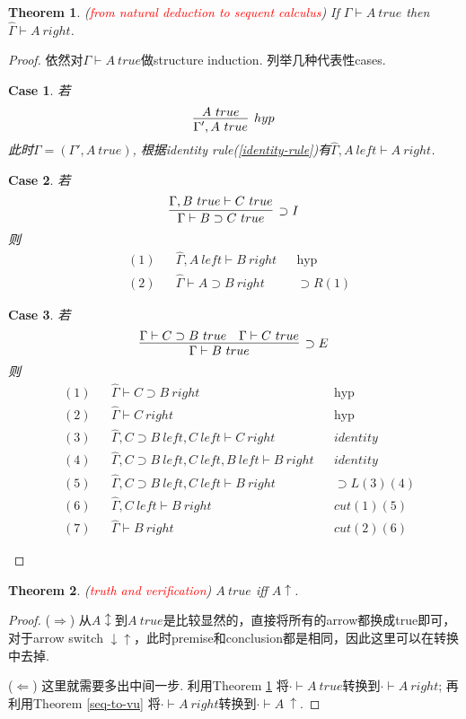 \documentclass{article}
\theoremstyle{plain}
\newtheorem{theorem}{Theorem}
\newcounter{case}
\newtheorem{case}{Case}
\theoremstyle{nonumberplain}
\newtheorem{proof}{Proof}
\newcommand{\redt}[1]{\textcolor{red}{#1}}
\begin{document}
\begin{theorem}\label{nd-to-seq}
\rm (\redt{from natural deduction to sequent calculus}) If $\Gamma \vdash A~true$ then $\widehat{\Gamma} \vdash A~right$.
\end{theorem}

\begin{proof}
\rm 依然对$\Gamma \vdash A~true$做structure induction. 列举几种代表性cases.
\begin{case}若
$$
\infer[hyp]{\Gamma', A~true}{A~true}
$$
此时$\Gamma = (\Gamma', A~true)$, 根据\emph{identity} rule(\ref{identity-rule})有$\widehat{\Gamma}, A~left \vdash A~right$.
\end{case}
\begin{case}若
$$
\infer[\supset I]{\Gamma \vdash B \supset C~true}{\Gamma, B~true \vdash C~true}
$$
则
$$
\begin{aligned}
&(1) && \widehat{\Gamma} ,A~left \vdash B~right  && \text{hyp} \\
&(2) && \widehat{\Gamma}  \vdash A \supset B ~right && \supset R(1)
\end{aligned}
$$
\end{case}
\begin{case}若
$$
\infer[\supset E]{\Gamma \vdash B~true}{\Gamma \vdash C \supset B~true & \Gamma \vdash C ~true}
$$
则
$$
\begin{aligned}
&(1) &&\widehat{\Gamma} \vdash C\supset B~right && \text{hyp} \\
&(2) &&\widehat{\Gamma} \vdash C~right && \text{hyp} \\
&(3) &&\widehat{\Gamma},C \supset B~left, C~left \vdash C~right && identity \\
&(4) &&\widehat{\Gamma},C \supset B~left, C~left, B~left \vdash B~right && identity \\ 
&(5) &&\widehat{\Gamma},C \supset B~left, C~left \vdash B~right && \supset L(3)(4) \\
&(6) &&\widehat{\Gamma}, C~left \vdash B~right && cut (1)(5) \\
&(7) &&\widehat{\Gamma} \vdash B~right && cut(2)(6)
\end{aligned}
$$
\end{case}
\end{proof}

\begin{theorem}
\rm (\redt{truth and verification}) $A~true$ iff $A \uparrow$. 
\end{theorem}

\begin{proof}
\rm ($\Rightarrow$) 从$A \updownarrow$到$A~true$是比较显然的，直接将所有的arrow都换成true即可，对于arrow switch $\downarrow\uparrow$，此时premise和conclusion都是相同，因此这里可以在转换中去掉. 

($\Leftarrow$) 这里就需要多出中间一步. 利用Theorem \ref{nd-to-seq} 将$\cdot\vdash A~true$转换到$\cdot \vdash A~right$; 再利用Theorem \ref{seq-to-vu} 将$\cdot \vdash A~right$转换到$\cdot \vdash A~\uparrow$. 
\end{proof}
\end{document}
